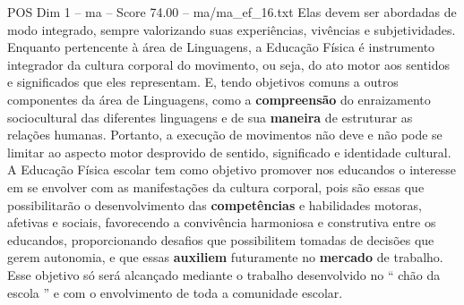 \begin{textsample}{POS Dim 1 – ma – Score 74.00 – ma/ma\_ef\_16.txt}
Elas devem ser abordadas de modo integrado, sempre valorizando suas experiências, vivências e subjetividades.
Enquanto pertencente à área de Linguagens, a Educação Física é instrumento integrador da cultura corporal do movimento, ou seja, do ato motor aos sentidos e significados que eles representam.
E, tendo objetivos comuns a outros componentes da área de Linguagens, como a \textbf{compreensão} do enraizamento sociocultural das diferentes linguagens e de sua \textbf{maneira} de estruturar as relações humanas.
Portanto, a execução de movimentos não deve e não pode se limitar ao aspecto motor desprovido de sentido, significado e identidade cultural.
A Educação Física escolar tem como objetivo promover nos educandos o interesse em se envolver com as manifestações da cultura corporal, pois são essas que possibilitarão o desenvolvimento das \textbf{competências} e habilidades motoras, afetivas e sociais, favorecendo a convivência harmoniosa e construtiva entre os educandos, proporcionando desafios que possibilitem tomadas de decisões que gerem autonomia, e que essas \textbf{auxiliem} futuramente no \textbf{mercado} de trabalho.
Esse objetivo só será alcançado mediante o trabalho desenvolvido no “ chão da escola ” e com o envolvimento de toda a comunidade escolar.

\end{textsample}
